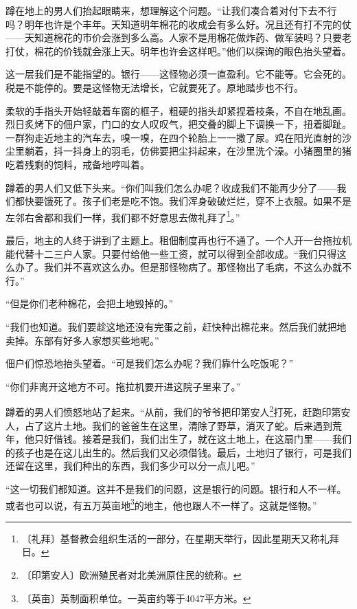 \documentclass[12pt,UTF-8,openany]{ctexbook}
\begin{document}
\begin{large}
    蹲在地上的男人们抬起眼睛来，想理解这个问题。“让我们凑合着对付下去不行吗？明年也许是个丰年。天知道明年棉花的收成会有多么好。况且还有打不完的仗——天知道棉花的市价会涨到多么高。人家不是用棉花做炸药、做军装吗？只要老打仗，棉花的价钱就会涨上天。明年也许会这样吧。”他们以探询的眼色抬头望着。
    
    这一层我们是不能指望的。银行——这怪物必须一直盈利。它不能等。它会死的。税是不能停的。要是这怪物无法增长，它就要死了。原地踏步也不行。
    
    柔软的手指头开始轻敲着车窗的框子，粗硬的指头却紧捏着枝条，不自在地乱画。烈日炙烤下的佃户家，门口的女人叹叹气，把交叠的脚上下调换一下，扭着脚趾。一群狗走近地主的汽车去，嗅一嗅，在四个轮胎上一一撒了尿。鸡在阳光直射的沙尘里躺着，抖一抖身上的羽毛，仿佛要把尘抖起来，在沙里洗个澡。小猪圈里的猪吃着残剩的饲料，戒备地哼叫着。
    
    蹲着的男人们又低下头来。“你们叫我们怎么办呢？收成我们不能再少分了——我们都快要饿死了。孩子们老是吃不饱。我们浑身破破烂烂，穿不上衣服。如果不是左邻右舍都和我们一样，我们都不好意思去做礼拜了\footnote{〔礼拜〕基督教会组织生活的一部分，在星期天举行，因此星期天又称礼拜日。}。”
    
    最后，地主的人终于讲到了主题上。租佃制度再也行不通了。一个人开一台拖拉机能代替十二三户人家。只要付给他一些工资，就可以得到全部收成。“我们只得这么办了。我们并不喜欢这么办。但是那怪物病了。那怪物出了毛病，不这么办就不行。”
    
    “但是你们老种棉花，会把土地毁掉的。”
    
    “我们也知道。我们要趁这地还没有完蛋之前，赶快种出棉花来。然后我们就把地卖掉。东部有好多人家想买些地呢。”
    
    佃户们惊恐地抬头望着。“可是我们怎么办呢？我们靠什么吃饭呢？”
    
    “你们非离开这地方不可。拖拉机要开进这院子里来了。”
    
    蹲着的男人们愤怒地站了起来。“从前，我们的爷爷把印第安人\footnote{〔印第安人〕欧洲殖民者对北美洲原住民的统称。}打死，赶跑印第安人，占了这片土地。我们的爸爸生在这里，清除了野草，消灭了蛇。后来遇到荒年，他只好借钱。接着是我们，我们出生了，就在这土地上，在这扇门里——我们的孩子也是在这儿出生的。然后我们又必须借钱。最后，土地归了银行，可是我们还留在这里，我们种出的东西，我们多少可以分一点儿吧。”
    
    “这一切我们都知道。这并不是我们的问题，这是银行的问题。银行和人不一样。或者也可以说，有五万英亩地\footnote{〔英亩〕英制面积单位。一英亩约等于4047平方米。}的地主，他也跟人不一样了。这就是怪物。”
    

\end{large}
\end{document}

